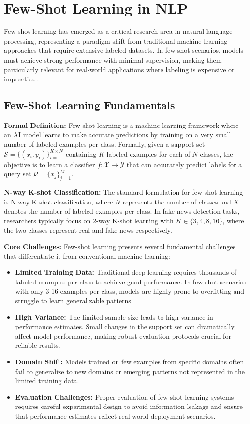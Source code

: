 \section{Few-Shot Learning in NLP}

Few-shot learning has emerged as a critical research area in natural language processing, representing a paradigm shift from traditional machine learning approaches that require extensive labeled datasets. In few-shot scenarios, models must achieve strong performance with minimal supervision, making them particularly relevant for real-world applications where labeling is expensive or impractical.

\subsection{Few-Shot Learning Fundamentals}

\textbf{Formal Definition:} Few-shot learning is a machine learning framework where an AI model learns to make accurate predictions by training on a very small number of labeled examples per class. Formally, given a support set $\mathcal{S} = \{(x_i, y_i)\}_{i=1}^{K \times N}$ containing $K$ labeled examples for each of $N$ classes, the objective is to learn a classifier $f: \mathcal{X} \rightarrow \mathcal{Y}$ that can accurately predict labels for a query set $\mathcal{Q} = \{x_j\}_{j=1}^{M}$.

\textbf{N-way K-shot Classification:} The standard formulation for few-shot learning is N-way K-shot classification, where $N$ represents the number of classes and $K$ denotes the number of labeled examples per class. In fake news detection tasks, researchers typically focus on 2-way K-shot learning with $K \in \{3, 4, 8, 16\}$, where the two classes represent real and fake news respectively.

\textbf{Core Challenges:} Few-shot learning presents several fundamental challenges that differentiate it from conventional machine learning:

\begin{itemize}
\item \textbf{Limited Training Data:} Traditional deep learning requires thousands of labeled examples per class to achieve good performance. In few-shot scenarios with only 3-16 examples per class, models are highly prone to overfitting and struggle to learn generalizable patterns.
\item \textbf{High Variance:} The limited sample size leads to high variance in performance estimates. Small changes in the support set can dramatically affect model performance, making robust evaluation protocols crucial for reliable results.
\item \textbf{Domain Shift:} Models trained on few examples from specific domains often fail to generalize to new domains or emerging patterns not represented in the limited training data.
\item \textbf{Evaluation Challenges:} Proper evaluation of few-shot learning systems requires careful experimental design to avoid information leakage and ensure that performance estimates reflect real-world deployment scenarios.
\end{itemize}

